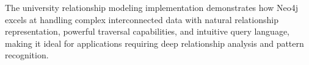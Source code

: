 The university relationship modeling implementation demonstrates how Neo4j excels at handling complex interconnected data with natural relationship representation, powerful traversal capabilities, and intuitive query language, making it ideal for applications requiring deep relationship analysis and pattern recognition.